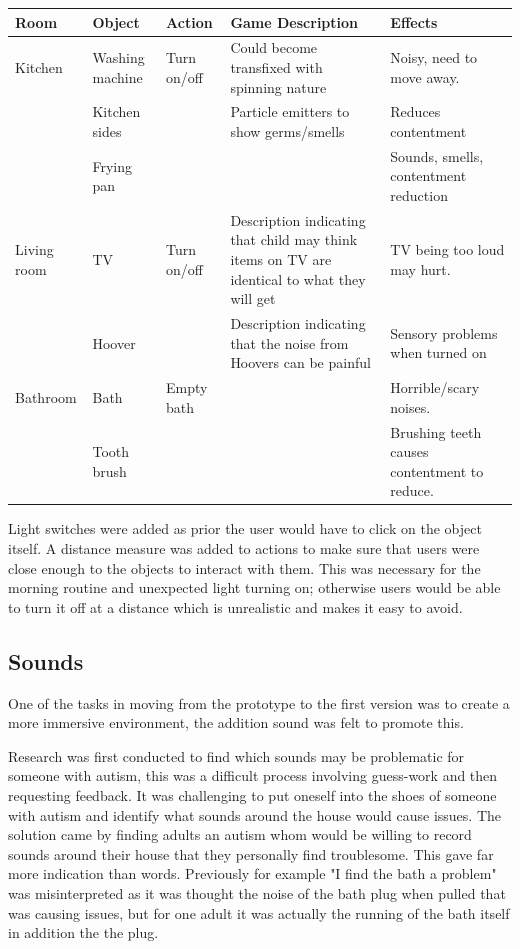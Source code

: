 \documentclass[11pt]{report}
\begin{document}
\begin{table}[H]
    \begin{tabular}{| p{2cm} | p{2cm} | p{3cm} | p{3cm} | p{4cm} | }
    \hline
    Room & Object & Action & Game Description & Effects                                                                  \\
    \hline
    \hline
        Kitchen & Washing machine & Turn on/off & Could become transfixed with spinning nature & Noisy, need to move away. \\
    \hline
    & Kitchen sides & & Particle emitters to show germs/smells & Reduces contentment \\
    \hline
    & Frying pan & & & Sounds, smells, contentment reduction \\
    \hline
    Living room & TV & Turn on/off & Description indicating that child may think items on TV are identical to what they will get & TV being too loud may hurt. \\
    \hline
    & Hoover & & Description indicating that the noise from Hoovers can be painful & Sensory problems when turned on \\
    \hline
    Bathroom & Bath & Empty bath & & Horrible/scary noises. \\
    \hline
    & Tooth brush & & & Brushing teeth causes contentment to reduce. \\
    \hline
    \end{tabular}
\end{table}

Light switches were added as prior the user would have to click on the object itself. A distance measure was added to actions to make sure that users were close enough to the objects to interact with them. This was necessary for the morning routine and unexpected light turning on; otherwise users would be able to turn it off at a distance which is unrealistic and makes it easy to avoid.

\subsection{Sounds}
One of the tasks in moving from the prototype to the first version was to create a more immersive environment, the addition sound was felt to promote this.

Research was first conducted to find which sounds may be problematic for someone with autism, this was a difficult process involving guess-work and then requesting feedback. It was challenging to put oneself into the shoes of someone with autism and identify what sounds around the house would cause issues. The solution came by finding adults an autism whom would be willing to record sounds around their house that they personally find troublesome. This gave far more indication than words. Previously for example "I find the bath a problem" was misinterpreted as it was thought the noise of the bath plug when pulled that was causing issues, but for one adult it was actually the running of the bath itself in addition the the plug.
\end{document}
